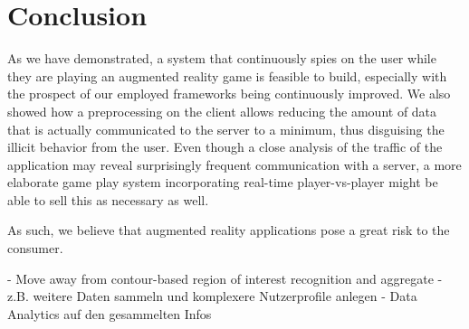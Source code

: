 \section{Conclusion}
\label{sec:conclusion}

As we have demonstrated, a system that continuously spies on the user while they are playing an augmented reality game is feasible to build, especially with the prospect of our employed frameworks being continuously improved. We also showed how a preprocessing on the client allows reducing the amount of data that is actually communicated to the server to a minimum, thus disguising the illicit behavior from the user. Even though a close analysis of the traffic of the application may reveal surprisingly frequent communication with a server, a more elaborate game play system incorporating real-time player-vs-player might be able to sell this as necessary as  well.

As such, we believe that augmented reality applications pose a great risk to the consumer. %



- Move away from contour-based region of interest recognition and aggregate 
- z.B. weitere Daten sammeln und komplexere Nutzerprofile anlegen
- Data Analytics auf den gesammelten Infos
